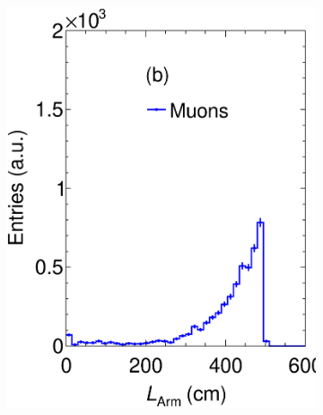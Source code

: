 \begin{figure}[t]
\begin{subfigure}[b]{0.32\textwidth}
         \includegraphics[width=\textwidth]{figures/ch5-KF_NDGAr/FullSample/PGun/Props/LArmTallpgun.eps}
         \caption{}
         \label{fig:LTPC_PGun}
     \end{subfigure}
          \begin{subfigure}[b]{0.32\textwidth}
         \centering

\end{subfigure}
\end{figure}
